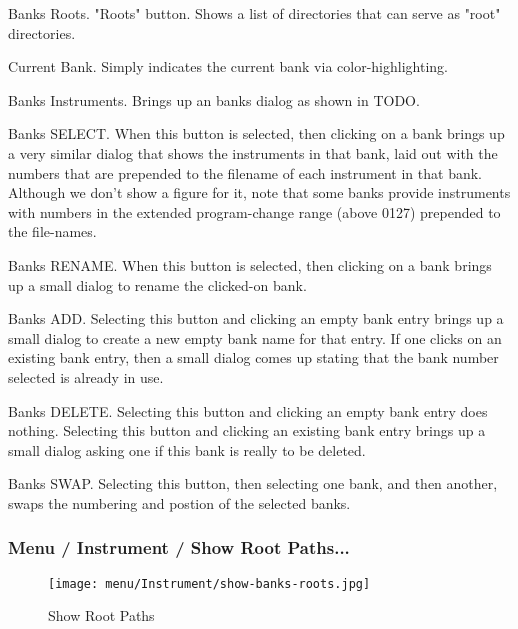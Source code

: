    \setcounter{ItemCounter}{0}      %

   Banks Roots.
   "Roots" button.
   Shows a list of directories that can serve as "root" directories.

   Current Bank.  Simply indicates the current bank via color-highlighting.

   Banks Instruments.
   Brings up an banks dialog as shown in
   TODO.

   Banks SELECT.
   When this button is selected, then clicking on a bank brings
   up a very similar dialog that shows the instruments in that bank, laid
   out with the numbers that are prepended to the filename of each
   instrument in that bank.
   Although we don't show a figure for it, note that some banks provide
   instruments with numbers in the extended program-change range (above
   0127) prepended to the file-names.

   Banks RENAME.
   When this button is selected, then clicking on a bank brings
   up a small dialog to rename the clicked-on bank.

   Banks ADD.
   Selecting this button and clicking an empty bank entry brings up a small
   dialog to create a new empty bank name for that entry.
   If one clicks on an existing bank entry, then a small dialog comes up
   stating that the bank number selected is already in use.

   Banks DELETE.
   Selecting this button and clicking an empty bank entry does nothing.
   Selecting this button and clicking an existing bank entry brings up a
   small dialog asking one if this bank is really to be deleted.

   Banks SWAP.
   Selecting this button, then selecting one bank, and then another,
   swaps the numbering and postion of the selected banks.

\subsubsection{Menu / Instrument / Show Root Paths...}
\label{subsubsec:menu_instrument_show_root_paths}

\begin{figure}[H]
   \centering 
   \texttt{[image: menu/Instrument/show-banks-roots.jpg]}
   \caption[Show Root Paths]{Show Root Paths}
   \label{fig:show_banks_roots}
\end{figure}

